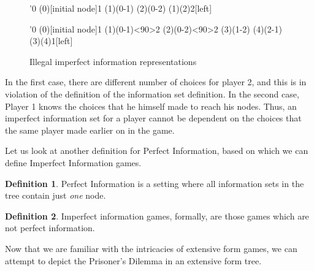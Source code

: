 \documentclass[11pt]{article}
\theoremstyle{definition}
\newtheorem*{definition}{Definition}
\begin{document}
\begin{figure}[h!]
\centering
\begin{minipage}{.5\textwidth}
	\centering
	\begin{istgame}
	\setistgrowdirection'{0}
	\xtdistance{12mm}{15mm}
	\istroot(0)[initial node]{1}
		\istb
		\istb
		\endist
	\xtdistance{10mm}{8mm}
	\istroot(1)(0-1)
		\istb
		\istb
		\istb
		\endist
	\istroot(2)(0-2)
		\istb
		\istb
		\endist
	\xtInfoset(1)(2){2}[left]
	\end{istgame}
\end{minipage}%
\begin{minipage}{.5\textwidth}
	\centering
	\begin{istgame}
	\setistgrowdirection'{0}
	\xtdistance{12mm}{15mm}
	\istroot(0)[initial node]{1}
		\istb
		\istb
		\endist
	\xtdistance{10mm}{8mm}
	\istroot(1)(0-1)<90>{2}
		\istb
		\istb
		\endist
	\istroot(2)(0-2)<90>{2}
		\istb
		\istb
		\endist
	\xtdistance{10mm}{5mm}
	\istroot(3)(1-2)
		\istb
		\istb
		\endist
	\istroot(4)(2-1)
		\istb
		\istb
		\endist
	\xtInfoset(3)(4){1}[left]
	\end{istgame}
\end{minipage}
\label{fig:illegal}
\caption{Illegal imperfect information representations}
\end{figure}

In the first case, there are different number of choices for player 2, and this is in violation of the definition of the information set definition.
In the second case, Player 1 knows the choices that he himself made to reach his nodes. Thus, an imperfect information set for a player cannot be dependent on the choices that the same player made earlier on in the game.

Let us look at another definition for Perfect Information, based on which we can define Imperfect Information games.

\begin{definition}
Perfect Information is a setting where all information sets in the tree contain just \textit{one} node.
\end{definition}

\begin{definition}
Imperfect information games, formally, are those games which are not perfect information.
\end{definition}

Now that we are familiar with the intricacies of extensive form games, we can attempt to depict the Prisoner's Dilemma in an extensive form tree.
\end{document}
